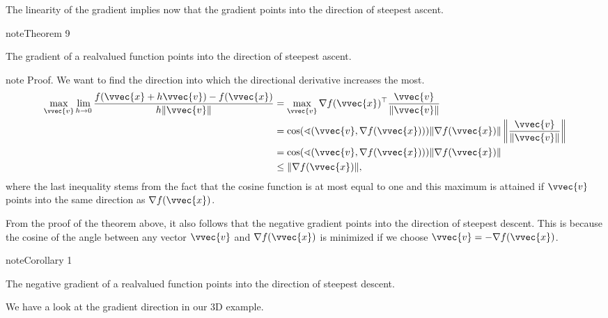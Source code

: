 \documentclass[letterpaper,10pt,english]{jupyterBook}
\begin{document}
\sphinxAtStartPar
The linearity of the gradient implies now that the gradient points into the direction of steepest ascent.
\label{optimization_numerical:theorem-4}
\begin{sphinxadmonition}{note}{Theorem 9}



\sphinxAtStartPar
The gradient of a real\sphinxhyphen{}valued function points into the direction of steepest ascent.
\end{sphinxadmonition}

\begin{sphinxadmonition}{note}
\sphinxAtStartPar
Proof. We want to find the direction into which the directional derivative increases the most.
\begin{align*} 
\max_{\vvec{v}}\lim_{h\rightarrow 0}\frac{f(\vvec{x}+h\vvec{v})-f(\vvec{x})}{h\lVert\vvec{v}\rVert} &= \max_{\vvec{v}} \nabla f(\vvec{x})^\top \frac{\vvec{v}}{\lVert\vvec{v}\rVert}\\
&= \cos(\sphericalangle (\vvec{v},\nabla f(\vvec{x}))) \lVert \nabla f(\vvec{x})\rVert \left\lVert \frac{\vvec{v}}{\lVert\vvec{v}\rVert}\right\rVert\\
&= \cos(\sphericalangle (\vvec{v},\nabla f(\vvec{x}))) \lVert \nabla f(\vvec{x})\rVert\\
&\leq \lVert \nabla f(\vvec{x})\rVert,
\end{align*}
\sphinxAtStartPar
where the last inequality stems from the fact that the cosine function is at most equal to one and this maximum is attained if \(\vvec{v}\) points into the same direction as \(\nabla f(\vvec{x})\).
\end{sphinxadmonition}

\sphinxAtStartPar
From the proof of the theorem above, it also follows that the negative gradient points into the direction of steepest descent. This is because the cosine of the angle between any vector \(\vvec{v}\) and \(\nabla f(\vvec{x})\) is minimized if we choose \(\vvec{v}=-\nabla f(\vvec{x})\).
\label{optimization_numerical:corollary-5}
\begin{sphinxadmonition}{note}{Corollary 1}



\sphinxAtStartPar
The negative gradient of a real\sphinxhyphen{}valued function points into the direction of steepest descent.
\end{sphinxadmonition}

\sphinxAtStartPar
We have a look at the gradient direction in our 3D example.
\end{document}
